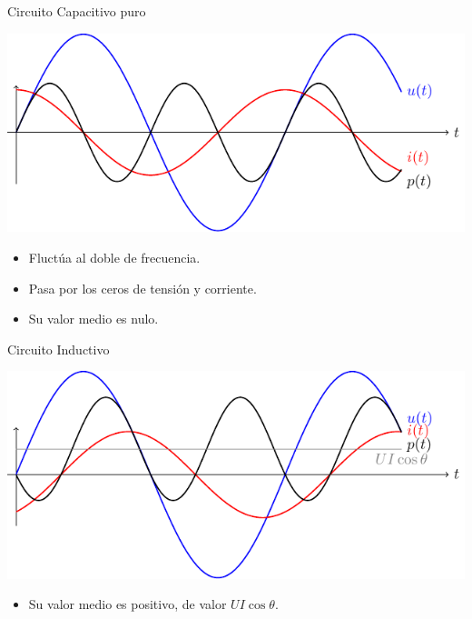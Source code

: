 \documentclass[xcolor={usenames,svgnames,dvipsnames}]{beamer}
\begin{document}
\begin{frame}[label={sec:org975c75f}]{Circuito Capacitivo puro}
\begin{center}
\includegraphics[width=.9\linewidth]{../figs/capacitivoPuroPotencia.pdf}
\end{center}

\begin{itemize}
\item Fluctúa al doble de frecuencia.
\item Pasa por los ceros de tensión y corriente.
\item Su valor medio es nulo.
\end{itemize}
\end{frame}

\begin{frame}[label={sec:org9487363}]{Circuito Inductivo}
\begin{center}
\includegraphics[width=.9\linewidth]{../figs/inductivoPotencia.pdf}
\end{center}

\begin{itemize}
\item Su valor medio es positivo, de valor \(U I \cos \theta\).
\end{itemize}
\end{frame}
\end{document}
